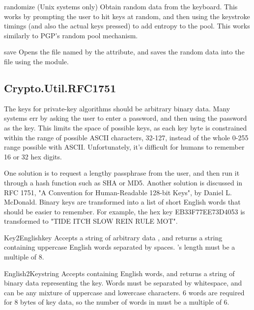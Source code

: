 \documentclass{howto}
\begin{document}
\begin{funcdesc}{randomize}{}
(Unix systems only)  Obtain random data from the keyboard.  This works
by prompting the
user to hit keys at random, and then using the keystroke timings (and
also the actual keys pressed) to add entropy to the pool.  This works
similarly to PGP's random pool mechanism.
\end{funcdesc}

\begin{funcdesc}{save}{}
Opens the file named by the  attribute, and saves the
random data into the file using the  module.
\end{funcdesc}


\subsection{Crypto.Util.RFC1751}
The keys for private-key algorithms should be arbitrary binary data.
Many systems err by asking the user to enter a password, and then using
the password as the key.  This limits the space of possible keys, as
each key byte is constrained within the range of possible ASCII
characters, 32-127, instead of the whole 0-255 range possible with ASCII.
Unfortunately, it's difficult for humans to remember 16 or 32 hex
digits.  

One solution is to request a lengthy passphrase from the user, and then
run it through a hash function such as SHA or MD5.  Another solution is
discussed in RFC 1751, "A Convention for Human-Readable 128-bit Keys",
by Daniel L. McDonald.  Binary keys are transformed into a list of short
English words that should be easier to remember.  For example, the hex
key EB33F77EE73D4053 is transformed to "TIDE ITCH SLOW REIN RULE MOT".

\begin{funcdesc}{Key2English}{key}
Accepts a string of arbitrary data , and returns a string
containing uppercase English words separated by spaces.  's
length must be a multiple of 8.
\end{funcdesc}

\begin{funcdesc}{English2Key}{string}
Accepts  containing English words, and returns a string of
binary data representing the key.  Words must be separated by
whitespace, and can be any mixture of uppercase and lowercase
characters.  6 words are required for 8 bytes of key data, so
the number of words in  must be a multiple of 6.
\end{funcdesc}
\end{document}
